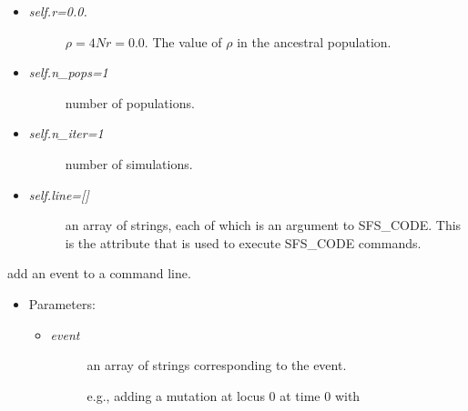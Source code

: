 \documentclass[letterpaper,10pt,english]{sphinxmanual}
\begin{document}
\begin{fulllineitems}
\begin{itemize}
\begin{itemize}
\begin{description}
\end{description}

\item {} \begin{description}
\item[{\emph{self.r=0.0.} }] \leavevmode
\(\rho = 4Nr = 0.0\).  The value of \(\rho\) in the 
ancestral population.

\end{description}

\item {} \begin{description}
\item[{\emph{self.n\_pops=1} }] \leavevmode
number of populations.

\end{description}

\item {} \begin{description}
\item[{\emph{self.n\_iter=1} }] \leavevmode
number of simulations.

\end{description}

\item {} \begin{description}
\item[{\emph{self.line={[}{]}} }] \leavevmode
an array of strings, each of which is an argument
to SFS\_CODE.  This is the attribute that is used to execute SFS\_CODE
commands.

\end{description}

\end{itemize}

\end{itemize}

\begin{fulllineitems}
\label{index:command.SFSCommand.add_event}
add an event to a command line.
\begin{itemize}
\item {} 
Parameters:
\begin{itemize}
\item {} \begin{description}
\item[{\emph{event} }] \leavevmode
an array of strings corresponding to the event.

e.g., adding a mutation at locus 0 at time 0 with


\end{description}
\end{itemize}
\end{itemize}
\end{fulllineitems}
\end{fulllineitems}
\end{document}
